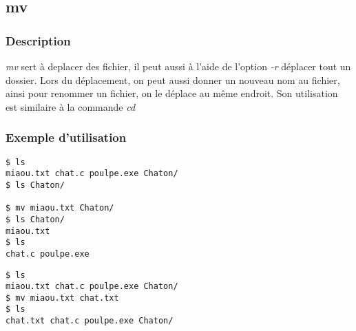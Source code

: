 \subsection*{mv}
\subsubsection*{Description}
\emph{mv} sert à deplacer des fichier, il peut aussi à l'aide de l'option \emph{-r} déplacer tout un dossier.
Lors du déplacement, on peut aussi donner un nouveau nom au fichier, ainsi pour renommer un fichier, on le déplace au même endroit.
Son utilisation est similaire à la commande \emph{cd}

\subsubsection*{Exemple d'utilisation}

\begin{lstlisting}[caption=déplacement d'un fichier]
$ ls
miaou.txt chat.c poulpe.exe Chaton/
$ ls Chaton/

$ mv miaou.txt Chaton/
$ ls Chaton/
miaou.txt
$ ls
chat.c poulpe.exe
\end{lstlisting}

\begin{lstlisting}[caption=renommer un fichier]
$ ls
miaou.txt chat.c poulpe.exe Chaton/
$ mv miaou.txt chat.txt
$ ls
chat.txt chat.c poulpe.exe Chaton/
\end{lstlisting}
